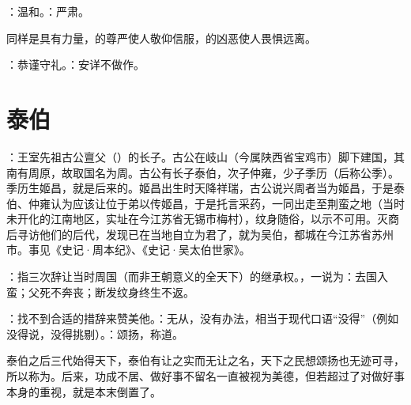 {
\item {}：温和。：严肃。
\item 同样是具有力量，的尊严使人敬仰信服，的凶恶使人畏惧远离。
\item {}：恭谨守礼。：安详不做作。
}
{}



\chapter{泰伯}

{
\item {}：王室先祖古公亶父（）的长子。古公在岐山（今属陕西省宝鸡市）脚下建国，其南有周原，故取国名为周。古公有长子泰伯，次子仲雍，少子季历（后称公季）。季历生姬昌，就是后来的。姬昌出生时天降祥瑞，古公说兴周者当为姬昌，于是泰伯、仲雍认为应该让位于弟以传姬昌，于是托言采药，一同出走至荆蛮之地（当时未开化的江南地区，实址在今江苏省无锡市梅村），纹身随俗，以示不可用。灭商后寻访他们的后代，发现已在当地自立为君了，就为吴伯，都城在今江苏省苏州市。事见《史记·周本纪》、《史记·吴太伯世家》。

\item {}：指三次辞让当时周国（而非王朝意义的全天下）的继承权。，一说为：去国入蛮；父死不奔丧；断发纹身终生不返。

\item {}：找不到合适的措辞来赞美他。：无从，没有办法，相当于现代口语“没得”（例如没得说，没得挑剔）。：颂扬，称道。

泰伯之后三代始得天下，泰伯有让之实而无让之名，天下之民想颂扬也无迹可寻，所以称为。后来，功成不居、做好事不留名一直被视为美德，但若超过了对做好事本身的重视，就是本末倒置了。
}
{}


